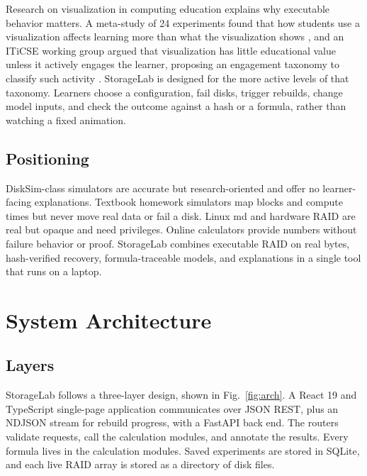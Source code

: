 \documentclass{ieeeaccess}
\begin{document}
Research on visualization in computing education explains why executable behavior matters. A meta-study of 24 experiments found that how students use a visualization affects learning more than what the visualization shows \cite{hundhausen2002meta}, and an ITiCSE working group argued that visualization has little educational value unless it actively engages the learner, proposing an engagement taxonomy to classify such activity \cite{naps2002exploring}. StorageLab is designed for the more active levels of that taxonomy. Learners choose a configuration, fail disks, trigger rebuilds, change model inputs, and check the outcome against a hash or a formula, rather than watching a fixed animation.

\subsection{Positioning}
DiskSim-class simulators are accurate but research-oriented and offer no learner-facing explanations. Textbook homework simulators map blocks and compute times but never move real data or fail a disk. Linux md and hardware RAID are real but opaque and need privileges. Online calculators provide numbers without failure behavior or proof. StorageLab combines executable RAID on real bytes, hash-verified recovery, formula-traceable models, and explanations in a single tool that runs on a laptop.

\section{System Architecture}
\label{sec:arch}

\subsection{Layers}
StorageLab follows a three-layer design, shown in Fig.~\ref{fig:arch}. A React 19 and TypeScript single-page application communicates over JSON REST, plus an NDJSON stream for rebuild progress, with a FastAPI back end. The routers validate requests, call the calculation modules, and annotate the results. Every formula lives in the calculation modules. Saved experiments are stored in SQLite, and each live RAID array is stored as a directory of disk files.
\end{document}
